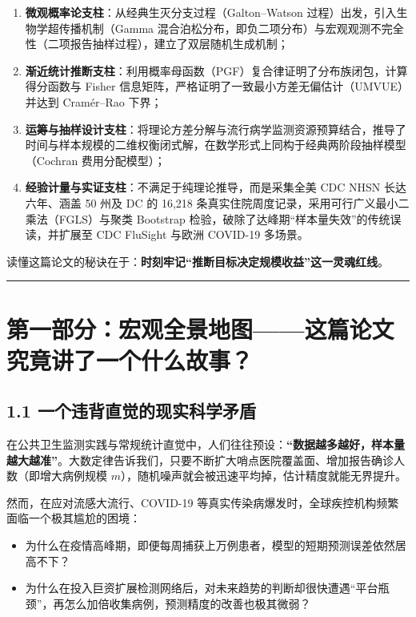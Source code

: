\documentclass[11pt,a4paper]{ctexart}
\begin{document}
\begin{enumerate}[leftmargin=2em, itemsep=2pt, parsep=0pt]
\item \textbf{微观概率论支柱}：从经典生灭分支过程（Galton–Watson 过程）出发，引入生物学超传播机制（Gamma 混合泊松分布，即负二项分布）与宏观观测不完全性（二项报告抽样过程），建立了双层随机生成机制；
\item \textbf{渐近统计推断支柱}：利用概率母函数（PGF）复合律证明了分布族闭包，计算得分函数与 Fisher 信息矩阵，严格证明了一致最小方差无偏估计（UMVUE）并达到 Cramér–Rao 下界；
\item \textbf{运筹与抽样设计支柱}：将理论方差分解与流行病学监测资源预算结合，推导了时间与样本规模的二维权衡闭式解，在数学形式上同构于经典两阶段抽样模型（Cochran 费用分配模型）；
\item \textbf{经验计量与实证支柱}：不满足于纯理论推导，而是采集全美 CDC NHSN 长达六年、涵盖 50 州及 DC 的 16,218 条真实住院周度记录，采用可行广义最小二乘法（FGLS）与聚类 Bootstrap 检验，破除了达峰期“样本量失效”的传统误读，并扩展至 CDC FluSight 与欧洲 COVID-19 多场景。
\end{enumerate}

读懂这篇论文的秘诀在于：\textbf{时刻牢记“推断目标决定规模收益”这一灵魂红线}。


\vspace{0.8em}\hrule\vspace{0.8em}

\section{第一部分：宏观全景地图——这篇论文究竟讲了一个什么故事？}

\subsection{1.1 一个违背直觉的现实科学矛盾}

在公共卫生监测实践与常规统计直觉中，人们往往预设：\textbf{“数据越多越好，样本量越大越准”}。大数定律告诉我们，只要不断扩大哨点医院覆盖面、增加报告确诊人数（即增大病例规模 $m$），随机噪声就会被迅速平均掉，估计精度就能无界提升。


然而，在应对流感大流行、COVID-19 等真实传染病爆发时，全球疾控机构频繁面临一个极其尴尬的困境：

\begin{itemize}[leftmargin=2em, itemsep=2pt, parsep=0pt]
\item 为什么在疫情高峰期，即便每周捕获上万例患者，模型的短期预测误差依然居高不下？
\item 为什么在投入巨资扩展检测网络后，对未来趋势的判断却很快遭遇“平台瓶颈”，再怎么加倍收集病例，预测精度的改善也极其微弱？
\end{itemize}
\end{document}
